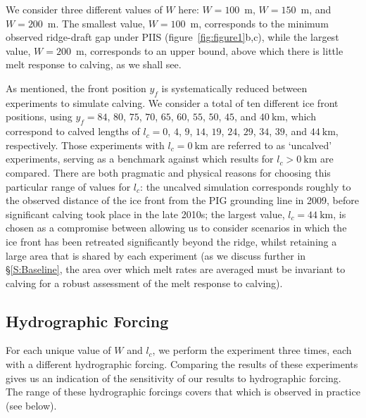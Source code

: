 \documentclass[draft]{agujournal2019}
\begin{document}
We consider three different values of $W$ here: $W=100$~m, $W=150$~m, and $W=200$~m. The smallest value, $W=100$~m, corresponds to the minimum observed ridge-draft gap under PIIS (figure~\ref{fig:figure1}b,c), while the largest value, $W=200$~m, corresponds to an upper bound, above which there is little melt response to calving, as we shall see. 

As mentioned, the front position $y_f$ is systematically reduced between experiments to simulate calving. We consider a total of ten different ice front positions, using $y_f=84$, $80$, $75$, $70$, $65$, $60$, $55$, $50$, $45$, and $40~\text{km}$, which correspond to calved lengths of $l_c=0$, $4$, $9$, $14$, $19$, $24$, $29$, $34$, $39$, and $44~\text{km}$, respectively. Those experiments with $l_c = 0~\text{km}$ are referred to as `uncalved' experiments, serving as a benchmark against which results for $l_c >0~\text{km}$ are compared. There are both pragmatic and physical reasons for choosing this particular range of values for $l_c$: the uncalved simulation corresponds roughly to the observed distance of the ice front from the PIG grounding line in 2009, before significant calving took place in the late 2010s; the largest value, $l_c = 44~\text{km}$, is chosen as a compromise between allowing us to consider scenarios in which the ice front has been retreated significantly beyond the ridge, whilst retaining a large area that is shared by each experiment (as we discuss further in \S\ref{S:Baseline}, the area over which melt rates are averaged must be invariant to calving for a robust assessment of the melt response to calving). 


\subsection{Hydrographic Forcing}\label{S:Experiment:Hydrography}
For each unique value of $W$ and $l_c$, we perform the experiment three times, each with a different hydrographic forcing. Comparing the results of these experiments gives us an indication of the sensitivity of our results to hydrographic forcing. The range of these hydrographic forcings covers that which is observed in practice (see below).
\end{document}
